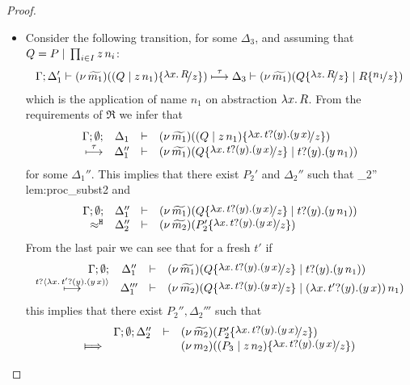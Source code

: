 \begin{proof}
\begin{enumerate}
\begin{itemize}
					\item	Consider the following transition, for some $\Delta_3$, and assuming that $Q = P \;|\; \prod_{i \in I} z\, {n_i}$:
							\begin{eqnarray}
								\horel{\Gamma}{\Delta_1'}{\newsp{\widetilde{m_1}}{(Q \Par \appl{z}{n_1}) \subst{{\abs{x}{R}}}{z} }}
								{\hby{\tau}}
								{\Delta_3}{\newsp{\widetilde{m_1}}{Q \subst{{\abs{z}{R}}}{z} \Par R \subst{n_1}{z}  }}
								\label{lem:proc_subst1}
							\end{eqnarray}
							which is the application of name $n_1$ on abstraction $\lambda x.\,R$.
							From the requirements of $\Re$ we infer that
							\begin{eqnarray*}
								\mhorel{\Gamma}{\Delta_1}{\newsp{\widetilde{m_1}}{(Q \Par \appl{z}{n_1}) \subst{\trvalx{t}}{z} }}
								{\hby{\tau}}
								{\Delta_1''}{}{\newsp{\widetilde{m_1}}{Q \subst{\trvalx{t}}{z} \Par \binp{t}{y} (\appl{y}{n_1})}}
							\end{eqnarray*}
							for some $\Delta_1''$. This implies that there exist $P_2'$ and $\Delta_2''$ such that
								{\Hby{}}
								{\Delta_2''}{}
								{lem:proc_subst2}
							and
							\begin{eqnarray*}
								\mhorel{\Gamma}{\Delta_1''}{\newsp{\widetilde{m_1}}{Q \subst{\trvalx{t}}{z} \Par \binp{t}{y} (\appl{y}{n_1})}}
								{\hwb}
								{\Delta_2''}{}{\newsp{\widetilde{m_2}}{P_2' \subst{\trvalx{t}}{z}}}
							\end{eqnarray*}
							From the last pair we can see that for a fresh $t'$ if
							\begin{eqnarray*}
								\mhorel{\Gamma}{\Delta_1''}{\newsp{\widetilde{m_1}}{Q \subst{\trvalx{t}}{z} \Par \binp{t}{y} (\appl{y}{n_1})}}
								{\hby{\bactinp{t}{\trvalx{t'}}}}
								{\Delta_1'''}{}{\newsp{\widetilde{m_2}}{Q \subst{\trvalx{t}}{z} \Par \appl{(\trvalx{t'})}{n_1}}}
							\end{eqnarray*}
							this implies that there exist $P_2'', \Delta_2'''$ such that
							\begin{eqnarray}
								\begin{array}{crll}
											& \Gamma; \es; \Delta_2'' &\proves& \newsp{\widetilde{m_2}}{P_2'\subst{\trvalx{t}}{z}}
									\\
									\Hby{}	&	&&	\newsp{m_2}{(P_3 \Par \appl{z}{n_2}) \subst{\trvalx{t}}{z}}

\end{array}
\end{eqnarray}
\end{itemize}
\end{enumerate}
\end{proof}
